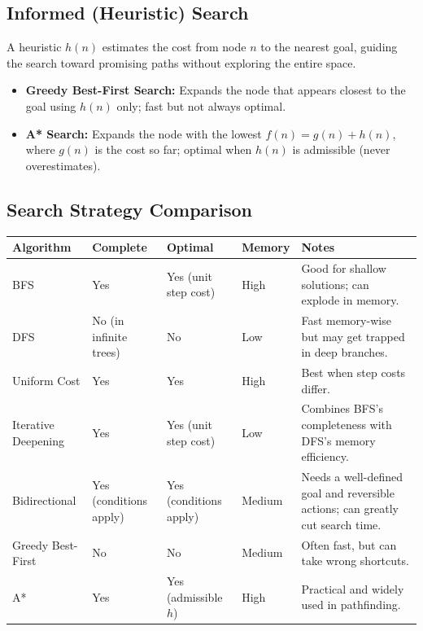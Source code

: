 \documentclass[11pt,a4paper]{article}
\begin{document}
\subsection{Informed (Heuristic) Search}
\begin{definitionbox}
A heuristic $h(n)$ estimates the cost from node $n$ to the nearest goal, guiding the search toward promising paths without exploring the entire space.
\end{definitionbox}
\begin{itemize}[leftmargin=*]
  \item \textbf{Greedy Best-First Search:} Expands the node that appears closest to the goal using $h(n)$ only; fast but not always optimal.
  \item \textbf{A* Search:} Expands the node with the lowest $f(n) = g(n) + h(n)$, where $g(n)$ is the cost so far; optimal when $h(n)$ is admissible (never overestimates).
\end{itemize}

\subsection{Search Strategy Comparison}
\begin{longtable}{@{}p{2.7cm}p{2.2cm}p{2.2cm}p{2.2cm}p{4.0cm}@{}}
\toprule
\rowcolor{primary!15}
\textbf{Algorithm} & \textbf{Complete} & \textbf{Optimal} & \textbf{Memory} & \textbf{Notes} \\
\midrule
\endhead
BFS & Yes & Yes (unit step cost) & High & Good for shallow solutions; can explode in memory. \\
\addlinespace
DFS & No (in infinite trees) & No & Low & Fast memory-wise but may get trapped in deep branches. \\
\addlinespace
Uniform Cost & Yes & Yes & High & Best when step costs differ. \\
\addlinespace
Iterative Deepening & Yes & Yes (unit step cost) & Low & Combines BFS's completeness with DFS's memory efficiency. \\
\addlinespace
Bidirectional & Yes (conditions apply) & Yes (conditions apply) & Medium & Needs a well-defined goal and reversible actions; can greatly cut search time. \\
\addlinespace
Greedy Best-First & No & No & Medium & Often fast, but can take wrong shortcuts. \\
\addlinespace
A* & Yes & Yes (admissible $h$) & High & Practical and widely used in pathfinding. \\
\bottomrule
\end{longtable}
\end{document}
